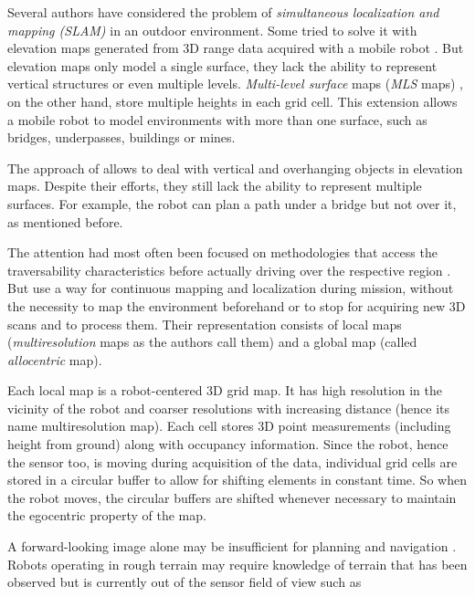 \documentclass[12pt,a4paper]{report}
\newcommand{\term}{\textit}
\newcommand{\acronym}{\MakeUppercase}
\begin{document}
	Several authors have considered the problem of \term{simultaneous localization 
	and mapping (\acronym{slam})} in an outdoor environment. Some tried to solve it 
	with elevation maps generated from \acronym{3d} range data acquired with a mobile 
	robot \citep{Pfaff}. But elevation maps only model a single surface, they lack the 
	ability to represent vertical structures or even multiple levels. \term{Multi-level 
	surface} maps (\term{\acronym{mls}} maps) \citep{Triebel}, on the other hand, store 
	multiple heights in each grid cell. This extension allows a mobile robot to model 
	environments with more than one surface, such as bridges, underpasses, buildings 
	or mines. 
	\par
	The approach of \citet{Pfaff} allows to deal with vertical and 
	overhanging objects in elevation maps. Despite their efforts, they still lack 
	the ability to represent multiple surfaces. For example, the robot can plan a 
	path under a bridge but not over it, as mentioned before.
	\par
	The attention had most often been focused on methodologies that access the 
	traversability characteristics before actually driving over the respective region 
	\citep{Papadakis}. But \citet{Droeschel} use a way for continuous mapping and 
	localization during mission, without the necessity to map the environment 
	beforehand or to stop for acquiring new \acronym{3d} scans and to process them. 
	Their representation consists of local maps (\term{multiresolution} maps as the 
	authors call them) and a global map (called \term{allocentric} map).
	\par
	Each local map is a robot-centered \acronym{3d} grid map. It has high resolution 
	in the vicinity of the robot and coarser resolutions with increasing distance 
	(hence its name multiresolution map). Each cell stores \acronym{3d} point 
	measurements (including height from ground) along with occupancy information. 
	Since the robot, hence the sensor too, is moving during acquisition of the data, 
	individual grid cells are stored in a circular buffer to allow for shifting 
	elements in constant time. So when the robot moves, the circular buffers are 
	shifted whenever necessary to maintain the egocentric property of the map.
	\par
	A forward-looking image alone may be insufficient for planning and navigation 
	\citep{Kweon}. Robots operating in rough terrain may require knowledge of terrain 
	that has been observed but is currently out of the sensor field of view such as 
\end{document}
